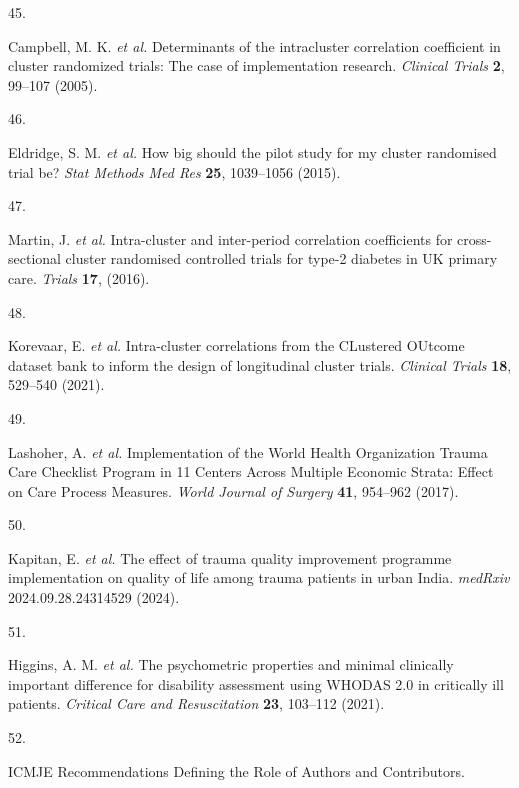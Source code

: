 \documentclass[
]{scrartcl}
\newlength{\cslhangindent}
\newlength{\csllabelwidth}
\newenvironment{CSLReferences}[2] %
 {\begin{list}{}{%
  \setlength{\itemindent}{0pt}
  \setlength{\leftmargin}{0pt}
  \setlength{\parsep}{0pt}
  \ifodd #1
   \setlength{\leftmargin}{\cslhangindent}
   \setlength{\itemindent}{-1\cslhangindent}
  \fi
  \setlength{\itemsep}{#2\baselineskip}}}
 {\end{list}}
\newcommand{\CSLLeftMargin}[1]{\parbox[t]{\csllabelwidth}{\strut#1\strut}}
\newcommand{\CSLRightInline}[1]{\parbox[t]{\linewidth - \csllabelwidth}{\strut#1\strut}}
\begin{document}
\begin{CSLReferences}{0}{0}
\CSLLeftMargin{45. }%
\CSLRightInline{Campbell, M. K. \emph{et al.} Determinants of the
intracluster correlation coefficient in cluster randomized trials: The
case of implementation research. \emph{Clinical Trials} \textbf{2},
99--107 (2005).}

\CSLLeftMargin{46. }%
\CSLRightInline{Eldridge, S. M. \emph{et al.} How big should the pilot
study for my cluster randomised trial be? \emph{Stat Methods Med Res}
\textbf{25}, 1039--1056 (2015).}

\CSLLeftMargin{47. }%
\CSLRightInline{Martin, J. \emph{et al.} Intra-cluster and inter-period
correlation coefficients for cross-sectional cluster randomised
controlled trials for type-2 diabetes in UK primary care. \emph{Trials}
\textbf{17}, (2016).}

\CSLLeftMargin{48. }%
\CSLRightInline{Korevaar, E. \emph{et al.} Intra-cluster correlations
from the CLustered OUtcome dataset bank to inform the design of
longitudinal cluster trials. \emph{Clinical Trials} \textbf{18},
529--540 (2021).}

\CSLLeftMargin{49. }%
\CSLRightInline{Lashoher, A. \emph{et al.} Implementation of the {World}
{Health} {Organization} {Trauma} {Care} {Checklist} {Program} in 11
{Centers} {Across} {Multiple} {Economic} {Strata}: {Effect} on {Care}
{Process} {Measures}. \emph{World Journal of Surgery} \textbf{41},
954--962 (2017).}

\CSLLeftMargin{50. }%
\CSLRightInline{Kapitan, E. \emph{et al.} The effect of trauma quality
improvement programme implementation on quality of life among trauma
patients in urban {India}. \emph{medRxiv} 2024.09.28.24314529 (2024).}

\CSLLeftMargin{51. }%
\CSLRightInline{Higgins, A. M. \emph{et al.} The psychometric properties
and minimal clinically important difference for disability assessment
using {WHODAS} 2.0 in critically ill patients. \emph{Critical Care and
Resuscitation} \textbf{23}, 103--112 (2021).}

\CSLLeftMargin{52. }%
\CSLRightInline{{ICMJE} {\textbar} {Recommendations} {\textbar}
{Defining} the {Role} of {Authors} and {Contributors}.}

\end{CSLReferences}
\end{document}

